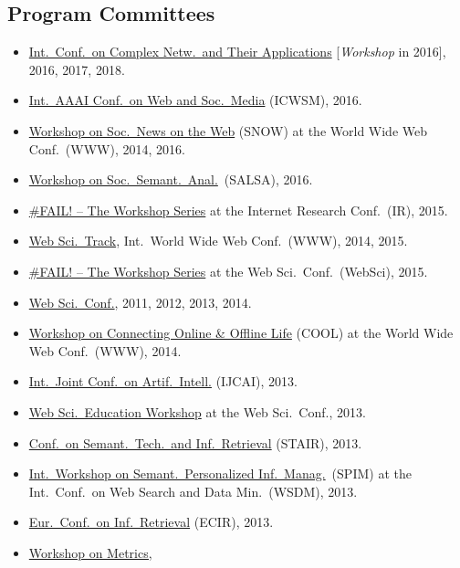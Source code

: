 \documentclass[line,mm]{res}
\newcounter{x}
\newcounter{y}
\begin{document}
\begin{resume}
\section{Program Committees}
\begin{itemize}
\item \href{http://www.complexnetworks.org/}{Int.\ Conf.\ on Complex
  Netw.\ and Their Applications} [\emph{Workshop} in 2016], 2016, 2017, 2018.   
\item \href{http://www.icwsm.org/2016/index.php}{Int.\ AAAI Conf.\ on
  Web and Soc.\ Media} (ICWSM), 2016.
\item \href{http://www.snow-workshop.org/}{Workshop on Soc.\ News on
  the Web} (SNOW) at the World Wide Web Conf.\ (WWW), 2014, 2016. 
\item \href{http://events.kmi.open.ac.uk/salsa2016/}{Workshop on Soc.\ Semant.\ Anal.}\ (SALSA), 2016.
\item \href{https://failworkshops.wordpress.com/fail-at-ir16/}{\#FAIL!
  -- The Workshop Series} at the Internet Research Conf.\ (IR), 2015.
\item \href{http://www.www2015.it/call-for-web-science-track/}{Web
  Sci.\ Track}, Int.\ World Wide Web Conf.\ (WWW), 2014, 2015.
\item \href{https://failworkshops.wordpress.com/fail-workshop-at-websci15/}{\#FAIL! -- The Workshop Series} at the Web Sci.\ Conf.\ (WebSci), 2015.
\item \href{http://www.websci14.org/}{Web Sci.\ Conf.},
  2011, 2012, 2013, 2014. 
\item \href{http://www.cool2014.com/}{Workshop on Connecting Online \&
  Offline Life} (COOL) at the World Wide Web Conf.\ (WWW), 2014. 
\item \href{http://ijcai13.org/}{Int.\ Joint Conf.\ on Artif.\ Intell.} (IJCAI), 2013.  
\item \href{http://webscience-education-workshop.blogs.usj.edu.lb/}{Web
  Sci.\ Education Workshop} at the Web Sci.\ Conf., 2013. 
\item \href{http://www.ftsm.ukm.my/stair13/}{Conf.\ on Semant.\ Tech.\ and Inf.\ Retrieval} (STAIR), 2013. 
\item \href{http://spim-workshop.org/}{Int.\ Workshop on Semant.\ Personalized Inf.\ Manag.}\ (SPIM) at the Int.\ Conf.\ on Web
  Search and Data Min.\ (WSDM), 2013.  
\item \href{http://ecir2013.org/}{Eur.\ Conf.\ on Inf.\ Retrieval} (ECIR), 2013.  
\item \href{http://mama.west.uni-koblenz.de/}{Workshop on Metrics,
}
\end{itemize}
\end{resume}
\end{document}
